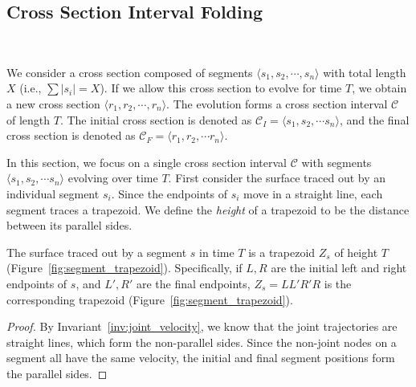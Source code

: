 

\subsection{Cross Section Interval Folding}
\label{sec:interval_folding}

~
\vspace*{-4ex}

\begin{definition}
\label{def:interval}
We consider a cross section composed of segments $ \langle s_1,s_2,\cdots,s_n \rangle$
with total length $X$ (i.e., $\sum \left| s_i\right| = X$).
If we allow this cross section to evolve for time $T$, we obtain a new cross section $\langle r_1,r_2,\cdots ,r_n \rangle$.
The evolution forms a cross section interval $\mathcal C$ of length $T$.
The initial cross section is denoted as $\mathcal C_I = \langle s_1, s_2,\cdots s_n \rangle$,
and the final cross section is denoted as $\mathcal C_F = \langle r_1, r_2,\cdots r_n \rangle$.
\end{definition}

In this section, we focus on a single cross section interval $\mathcal C$ with segments $\langle s_1, s_2,\cdots s_n \rangle$ evolving over time $T$.
First consider the surface traced out by an individual segment $s_i$.
Since the endpoints of $s_i$ move in a straight line, each segment traces a trapezoid.
We define the \emph{height} of a trapezoid to be the distance between its parallel sides.

\begin{lemma}
\label{lem:trapezoid}
The surface traced out by a segment $s$ in time $T$ is a trapezoid $Z_s$ of height $T$ (Figure~\ref{fig:segment_trapezoid}).
Specifically, if $L,R$ are the initial left and right endpoints of $s$, and $L',R'$ are the final endpoints,
$Z_s = LL'R'R$ is the corresponding trapezoid (Figure~\ref{fig:segment_trapezoid}).
\end{lemma}
\begin{proof}
By Invariant~\ref{inv:joint_velocity}, we know that the joint trajectories are straight lines, which form the non-parallel sides.
Since the non-joint nodes on a segment all have the same velocity, the initial and final segment positions form the parallel sides.
\end{proof}

